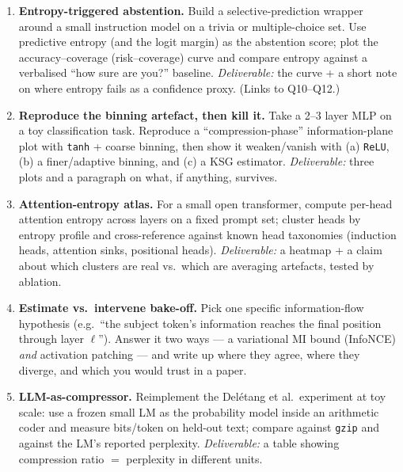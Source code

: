 \documentclass[11pt,letterpaper]{article}
\begin{document}

\begin{enumerate}[leftmargin=*,itemsep=0.7em]
\item \textbf{Entropy-triggered abstention.} Build a selective-prediction wrapper
around a small instruction model on a trivia or multiple-choice set. Use predictive
entropy (and the logit margin) as the abstention score; plot the
accuracy--coverage (risk--coverage) curve and compare entropy against a verbalised
``how sure are you?'' baseline. \emph{Deliverable:} the curve + a short note on
where entropy fails as a confidence proxy. (Links to Q10--Q12.)

\item \textbf{Reproduce the binning artefact, then kill it.} Take a 2--3 layer MLP
on a toy classification task. Reproduce a ``compression-phase'' information-plane
plot with \texttt{tanh} + coarse binning, then show it weaken/vanish with (a)
\texttt{ReLU}, (b) a finer/adaptive binning, and (c) a KSG estimator.
\emph{Deliverable:} three plots and a paragraph on what, if anything, survives.

\item \textbf{Attention-entropy atlas.} For a small open transformer, compute
per-head attention entropy across layers on a fixed prompt set; cluster heads by
entropy profile and cross-reference against known head taxonomies (induction heads,
attention sinks, positional heads). \emph{Deliverable:} a heatmap + a claim about
which clusters are real vs.\ which are averaging artefacts, tested by ablation.

\item \textbf{Estimate vs.\ intervene bake-off.} Pick one specific information-flow
hypothesis (e.g.\ ``the subject token's information reaches the final position
through layer $\ell$''). Answer it two ways --- a variational MI bound (InfoNCE)
\emph{and} activation patching --- and write up where they agree, where they
diverge, and which you would trust in a paper.

\item \textbf{LLM-as-compressor.} Reimplement the Del\'etang et al.\ experiment at
toy scale: use a frozen small LM as the probability model inside an arithmetic
coder and measure bits/token on held-out text; compare against \texttt{gzip} and
against the LM's reported perplexity. \emph{Deliverable:} a table showing
compression ratio $=$ perplexity in different units.
\end{enumerate}
\end{document}
